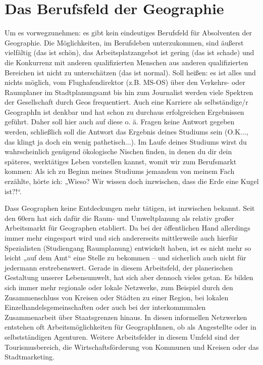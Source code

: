 \section*{Das Berufsfeld der Geographie}
Um es vorwegzunehmen: es gibt kein eindeutiges Berufsfeld für Absolventen der Geographie. Die Möglichkeiten, im Berufsleben unterzukommen, sind äußerst vielfältig (das ist schön), das Arbeitsplatzangebot ist gering (das ist schade) und die Konkurrenz mit anderen qualifizierten Menschen aus anderen qualifizierten Bereichen ist nicht zu unterschätzen (das ist normal). Soll heißen: es ist alles und nichts möglich, vom Flughafendirektor (z.B. MS-OS) über den Verkehrs- oder Raumplaner im Stadtplanungsamt bis hin zum Journalist werden viele Spektren der Gesellschaft durch Geos frequentiert. Auch eine Karriere als selbständige/r GeographIn ist denkbar und hat schon zu durchaus erfolgreichen Ergebnissen geführt. Daher soll hier auch auf diese o. ä. Fragen keine Antwort gegeben werden, schließlich soll die Antwort das Ergebnis deines Studiums sein (O.K..., das klingt ja doch ein wenig pathetisch...). Im Laufe deines Studiums wirst du wahrscheinlich genügend ökologische Nischen ﬁnden, in denen du dir dein späteres, werktätiges Leben vorstellen kannst, womit wir zum Berufsmarkt kommen: Als ich zu Beginn meines Studiums jemandem von meinem Fach erzählte, hörte ich: „Wieso? Wir wissen doch inzwischen, dass die Erde eine Kugel ist?!“.

Dass Geographen keine Entdeckungen mehr tätigen, ist inzwischen bekannt. Seit den 60ern hat sich dafür die Raum- und Umweltplanung als relativ großer Arbeitsmarkt für Geographen etabliert. Da bei der öffentlichen Hand allerdings immer mehr eingespart wird und sich andererseits mittlerweile auch hierfür Spezialisten (Studiengang Raumplanung) entwickelt haben, ist es nicht mehr so leicht „auf dem Amt“ eine Stelle zu bekommen – und sicherlich auch nicht für jedermann erstrebenswert. Gerade in diesem Arbeitsfeld, der planerischen Gestaltung unserer Lebensumwelt, hat sich aber dennoch vieles getan. Es bilden sich immer mehr regionale oder lokale Netzwerke, zum Beispiel durch den Zusammenschluss von Kreisen oder Städten zu einer Region, bei lokalen Einzelhandelsgemeinschaften oder auch bei der interkommunalen Zusammenarbeit über Staatsgrenzen hinaus. In diesen informellen Netzwerken entstehen oft Arbeitsmöglichkeiten für GeographInnen, ob als Angestellte oder in selbstständigen Agenturen. Weitere Arbeitsfelder in diesem Umfeld sind der Tourismusbereich, die Wirtschaftsförderung von Kommunen und Kreisen oder das Stadtmarketing.

